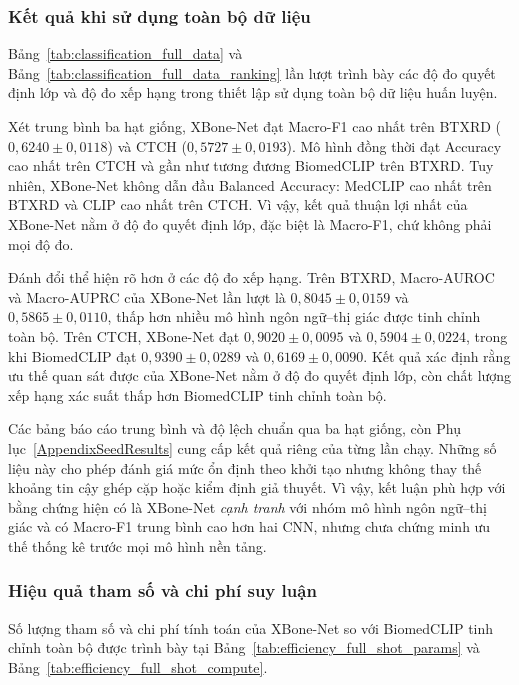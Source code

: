 \subsubsection{Kết quả khi sử dụng toàn bộ dữ liệu}
\label{subsec:full_data_results}
Bảng~\ref{tab:classification_full_data} và Bảng~\ref{tab:classification_full_data_ranking} lần lượt trình bày các độ đo quyết định lớp và độ đo xếp hạng trong thiết lập sử dụng toàn bộ dữ liệu huấn luyện.



Xét trung bình ba hạt giống, XBone-Net đạt Macro-F1 cao nhất trên BTXRD ($0{,}6240\pm0{,}0118$) và CTCH ($0{,}5727\pm0{,}0193$). Mô hình đồng thời đạt Accuracy cao nhất trên CTCH và gần như tương đương BiomedCLIP trên BTXRD. Tuy nhiên, XBone-Net không dẫn đầu Balanced Accuracy: MedCLIP cao nhất trên BTXRD và CLIP cao nhất trên CTCH. Vì vậy, kết quả thuận lợi nhất của XBone-Net nằm ở độ đo quyết định lớp, đặc biệt là Macro-F1, chứ không phải mọi độ đo.



Đánh đổi thể hiện rõ hơn ở các độ đo xếp hạng. Trên BTXRD, Macro-AUROC và Macro-AUPRC của XBone-Net lần lượt là $0{,}8045\pm0{,}0159$ và $0{,}5865\pm0{,}0110$, thấp hơn nhiều mô hình ngôn ngữ--thị giác được tinh chỉnh toàn bộ. Trên CTCH, XBone-Net đạt $0{,}9020\pm0{,}0095$ và $0{,}5904\pm0{,}0224$, trong khi BiomedCLIP đạt $0{,}9390\pm0{,}0289$ và $0{,}6169\pm0{,}0090$. Kết quả xác định rằng ưu thế quan sát được của XBone-Net nằm ở độ đo quyết định lớp, còn chất lượng xếp hạng xác suất thấp hơn BiomedCLIP tinh chỉnh toàn bộ.

Các bảng báo cáo trung bình và độ lệch chuẩn qua ba hạt giống, còn Phụ lục~\ref{AppendixSeedResults} cung cấp kết quả riêng của từng lần chạy. Những số liệu này cho phép đánh giá mức ổn định theo khởi tạo nhưng không thay thế khoảng tin cậy ghép cặp hoặc kiểm định giả thuyết. Vì vậy, kết luận phù hợp với bằng chứng hiện có là XBone-Net \emph{cạnh tranh} với nhóm mô hình ngôn ngữ--thị giác và có Macro-F1 trung bình cao hơn hai CNN, nhưng chưa chứng minh ưu thế thống kê trước mọi mô hình nền tảng.

\subsubsection{Hiệu quả tham số và chi phí suy luận}
\label{subsec:rq1_efficiency_results}
Số lượng tham số và chi phí tính toán của XBone-Net so với BiomedCLIP tinh chỉnh toàn bộ được trình bày tại Bảng~\ref{tab:efficiency_full_shot_params} và Bảng~\ref{tab:efficiency_full_shot_compute}.

